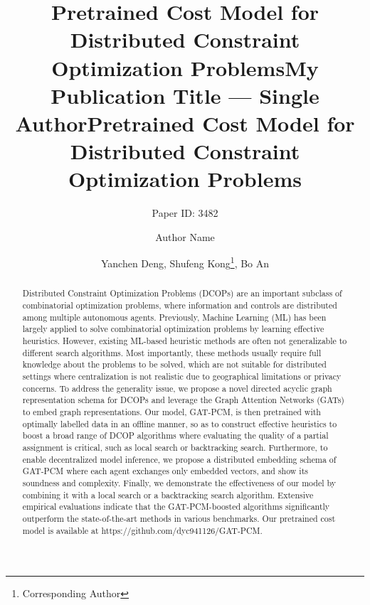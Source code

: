 \documentclass[letterpaper]{article} %
\title{Pretrained Cost Model for Distributed Constraint Optimization Problems}
\author{
    Paper ID: 3482
}
\title{My Publication Title --- Single Author}
\author {
    Author Name
}
\title{Pretrained Cost Model for Distributed Constraint Optimization Problems}
\author {
    Yanchen Deng,
    Shufeng Kong\footnote{Corresponding Author},
    Bo An
}
\begin{document}
\maketitle

\begin{abstract}
Distributed Constraint Optimization Problems (DCOPs) are an important subclass of combinatorial optimization problems, where information and controls are distributed among multiple autonomous agents. 
Previously, Machine Learning (ML) has been largely applied to solve combinatorial optimization problems by learning effective heuristics. However, existing ML-based heuristic methods are often not generalizable to different search algorithms.
Most importantly, these methods usually require full knowledge about the problems to be solved, which are not suitable for distributed settings where centralization is not realistic due to geographical limitations or privacy concerns. To address the generality issue, we propose a novel directed acyclic graph representation schema for DCOPs and leverage the Graph Attention Networks (GATs) to embed graph representations. Our model, GAT-PCM, is then pretrained with optimally labelled data in an offline manner, so as to construct effective heuristics to boost a broad range of DCOP algorithms where evaluating the quality of a partial assignment is critical, such as local search or backtracking search. Furthermore, to enable decentralized model inference, we propose a distributed embedding schema of GAT-PCM where each agent exchanges only embedded vectors, and show its soundness and complexity.
Finally, we demonstrate the effectiveness of our model by combining it with a local search or a backtracking search algorithm. Extensive empirical evaluations indicate that the GAT-PCM-boosted algorithms significantly outperform the state-of-the-art methods in various benchmarks. Our pretrained cost model is available at https://github.com/dyc941126/GAT-PCM.

\end{abstract}
\end{document}
